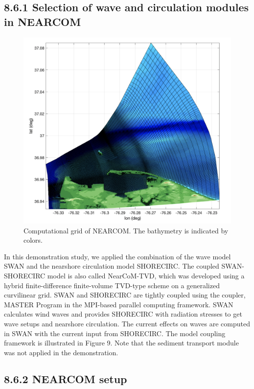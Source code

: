 \documentclass[preprint,12pt,authoryear] {elsarticle}
\begin{document}
\subsection*{8.6.1 Selection of wave and circulation modules in NEARCOM}

\begin{figure}
\centering
\includegraphics[width=\textwidth]{./figures/nearcom_grid.png}
\caption{Computational grid of NEARCOM. The bathymetry is indicated by colors.}
\label{boundary}
\centering
\end{figure}

In this demonstration study, we applied the combination of the wave model SWAN and the nearshore circulation model SHORECIRC. The coupled SWAN-SHORECIRC model is also called NearCoM-TVD, which was developed using a hybrid finite-difference finite-volume TVD-type scheme on a generalized curvilinear grid. SWAN and SHORECIRC are tightly coupled using the coupler, MASTER Program in the MPI-based parallel computing framework. SWAN calculates wind waves and provides SHORECIRC with radiation stresses to get wave setups and nearshore circulation. The current effects on waves are computed in SWAN with the current input from SHORECIRC.
The model coupling framework is illustrated in Figure 9. Note that the sediment transport module was not applied in the demonstration.

\subsection*{8.6.2 NEARCOM setup}
\end{document}

